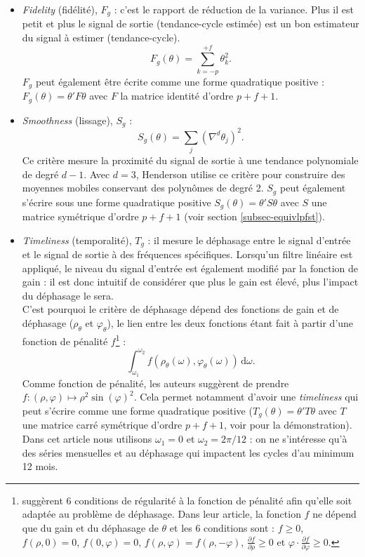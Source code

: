 \documentclass[
  12pt,
  a4paper,french]{article}
\newcommand\1{\mathds{1}}
\newcommand\ud{\,\mathrm{d}}
\begin{document}
\begin{itemize}
\item
  \emph{Fidelity} (fidélité), \(F_g\) : c'est le rapport de réduction de la variance.
  Plus il est petit et plus le signal de sortie (tendance-cycle estimée) est un bon estimateur du signal à estimer (tendance-cycle).
  \[
  F_g(\theta) = \sum_{k=-p}^{+f}\theta_{k}^{2}.
  \]
  \(F_g\) peut également être écrite comme une forme quadratique positive : \(F_g(\theta)=\theta'F\theta\) avec \(F\) la matrice identité d'ordre \(p+f+1\).
\item
  \emph{Smoothness} (lissage), \(S_g\) :
  \[
  S_g(\theta) = \sum_{j}(\nabla^{d}\theta_{j})^{2}.
  \]
  Ce critère mesure la proximité du signal de sortie à une tendance polynomiale de degré \(d-1\).
  Avec \(d=3\), Henderson utilise ce critère pour construire des moyennes mobiles conservant des polynômes de degré 2.
  \(S_g\) peut également s'écrire sous une forme quadratique positive \(S_g(\theta)=\theta'S\theta\) avec \(S\) une matrice symétrique d'ordre \(p+f+1\) (voir section \ref{subsec-equivlpfst}).
\item
  \emph{Timeliness} (temporalité), \(T_g\) : il mesure le déphasage entre le signal d'entrée et le signal de sortie à des fréquences spécifiques.
  Lorsqu'un filtre linéaire est appliqué, le niveau du signal d'entrée est également modifié par la fonction de gain : il est donc intuitif de considérer que plus le gain est élevé, plus l'impact du déphasage le sera.\\
  C'est pourquoi le critère de déphasage dépend des fonctions de gain et de déphasage (\(\rho_\theta\) et \(\varphi_{\theta}\)), le lien entre les deux fonctions étant fait à partir d'une fonction de pénalité \(f\)\footnote{
    \textcite{ch15HBSA} suggèrent 6 conditions de régularité à la fonction de pénalité afin qu'elle soit adaptée au problème de déphasage.
    Dans leur article, la fonction \(f\) ne dépend que du gain et du déphasage de \(\theta\) et les 6 conditions sont : \(f \geq 0\), \(f\left(\rho,0\right)=0\), \(f\left(0,\varphi\right)=0\), \(f\left(\rho,\varphi\right)=f\left(\rho,-\varphi\right)\), \(\frac{\partial f}{\partial \rho} \geq 0\) et
    \(\varphi \cdot \frac{\partial f}{\partial \varphi} \geq 0\).} :
  \[
  \int_{\omega_{1}}^{\omega_{2}}f(\rho_{\theta}(\omega),\varphi_{\theta}(\omega))\ud\omega.
  \]
  Comme fonction de pénalité, les auteurs suggèrent de prendre \(f\colon(\rho,\varphi)\mapsto\rho^2\sin(\varphi)^2\).
  Cela permet notamment d'avoir une \emph{timeliness} qui peut s'écrire comme une forme quadratique positive (\(T_g(\theta)=\theta'T\theta\) avec \(T\) une matrice carré symétrique d'ordre \(p+f+1\), voir \textcite{ch15HBSA} pour la démonstration).
  Dans cet article nous utilisons \(\omega_1=0\) et \(\omega_2=2\pi/12\) : on ne s'intéresse qu'à des séries mensuelles et au déphasage qui impactent les cycles d'au minimum 12 mois.
\end{itemize}
\end{document}
